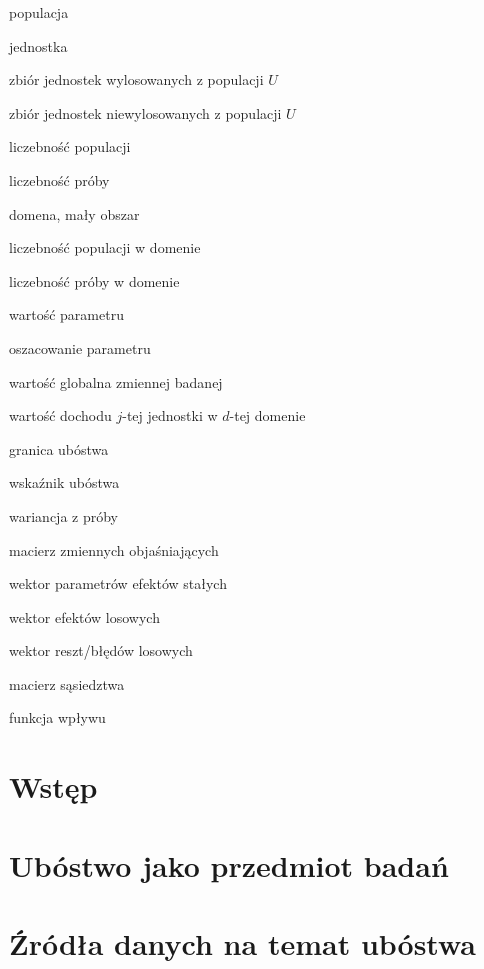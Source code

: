 \documentclass[11pt,twoside]{report}
\begin{document}
\begin{description}[leftmargin=8em,style=nextline,itemsep=0pt]
\item[$U$] populacja
\item[$j$] jednostka
\item[$s$] zbiór jednostek wylosowanych z populacji $U$
\item[$r$] zbiór jednostek niewylosowanych z populacji $U$
\item[$N$] liczebność populacji
\item[$n$] liczebność próby
\item[$d$] domena, mały obszar
\item[$N_d$] liczebność populacji w domenie
\item[$n_d$] liczebność próby w domenie
\item[$\theta$] wartość parametru
\item[$\hat{\theta}$] oszacowanie parametru
\item[$Y$] wartość globalna zmiennej badanej
\item[$E_{dj}$] wartość dochodu $j$-tej jednostki w $d$-tej domenie
\item[$z$] granica ubóstwa
\item[$F_{\alpha}$] wskaźnik ubóstwa
\item[$\psi$] wariancja z próby
\item[$\boldsymbol{x}$] macierz zmiennych objaśniających
\item[$\beta$] wektor parametrów efektów stałych
\item[$u$] wektor efektów losowych
\item[$e$] wektor reszt/błędów losowych
\item[$W$] macierz sąsiedztwa
\item[$\Psi$] funkcja wpływu
\end{description}

\clearpage
{}

\chapter*{Wstęp}


\chapter{Ubóstwo jako przedmiot badań}


\chapter{Źródła danych na temat ubóstwa}

\end{document}
